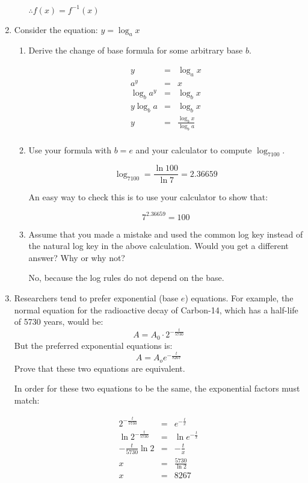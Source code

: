\documentclass[letterpaper,12pt,fleqn]{article}
\begin{document}
\begin{enumerate}
\begin{enumerate}
$\therefore f(x)=f^{-1}(x)$

\bigskip

\end{enumerate}

\item Consider the equation: $y=\log_a{x}$
\begin{enumerate}
\item Derive the change of base formula for some arbitrary base $b$.

\begin{eqnarray*}
y &=& \log_a{x} \\
a^y &=& x \\
\log_b{a^y} &=& \log_b{x} \\
y\log_b{a} &=& \log_b{x} \\
y &=& \frac{\log_b{x}}{\log_b{a}} \\
\end{eqnarray*}

\item Use your formula with $b=e$ and your calculator to compute $\log_7100$.

\[\log_7100=\frac{\ln{100}}{\ln{7}}=2.36659\]

An easy way to check this is to use your calculator to show that:

\[7^{2.36659}=100\]

\item Assume that you made a mistake and used the common log key instead of the
natural log key in the above calculation. Would you get a different answer?
Why or why not?

\bigskip

No, because the log rules do not depend on the base.

\bigskip
\end{enumerate} 

\item Researchers tend to prefer exponential (base $e$) equations. For example,
the normal equation for the radioactive decay of Carbon-14, which has a
half-life of 5730 years, would be:
\[A=A_0\cdot2^{-\frac{t}{5730}}\]
But the preferred exponential equations is:
\[A=A_oe^{-\frac{t}{8267}}\]
Prove that these two equations are equivalent.

\bigskip

In order for these two equations to be the same, the exponential factors must
match:

\begin{eqnarray*}
2^{-\frac{t}{5730}} &=& e^{-\frac{t}{x}} \\
\ln{2^{-\frac{t}{5730}}} &=& \ln{e^{-\frac{t}{x}}} \\
-\frac{t}{5730}\ln{2} &=& -\frac{t}{x} \\
x &=& \frac{5730}{\ln{2}} \\
x &=& 8267 \\
\end{eqnarray*}


\end{enumerate}
\end{document}

